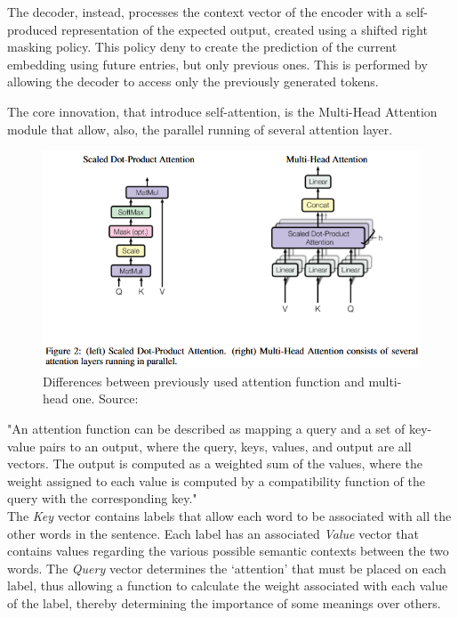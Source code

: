 \documentclass[12pt]{article}
\begin{document}
The decoder, instead, processes the context vector of the encoder with a self-produced representation of the expected output, created using a shifted right masking policy. This policy deny to create the prediction of the current embedding using future entries, but only previous ones. This is performed by allowing the decoder to access only the previously generated tokens.

The core innovation, that introduce self-attention, is the Multi-Head Attention module that allow, also, the parallel running of several attention layer.
	\begin{figure}[H]
    \centering
            \includegraphics[width=1\textwidth]{attention.png}
    \caption[Multi-head attention function]{Differences between previously used attention function and multi-head one. Source: \cite{vaswani2023attentionneed}}
    \end{figure}
"An attention function can be described as mapping a query and a set of key-value pairs to an output, where the query, keys, values, and output are all vectors. The output is computed as a weighted sum of the values, where the weight assigned to each value is computed by a compatibility function of the query with the corresponding key."\cite{vaswani2023attentionneed}\\
The \textit{Key} vector contains labels that allow each word to be associated with all the other words in the sentence. Each label has an associated \textit{Value} vector that contains values regarding the various possible semantic contexts between the two words. The \textit{Query} vector determines the ‘attention’ that must be placed on each label, thus allowing a function to calculate the weight associated with each value of the label, thereby determining the importance of some meanings over others.
\end{document}
